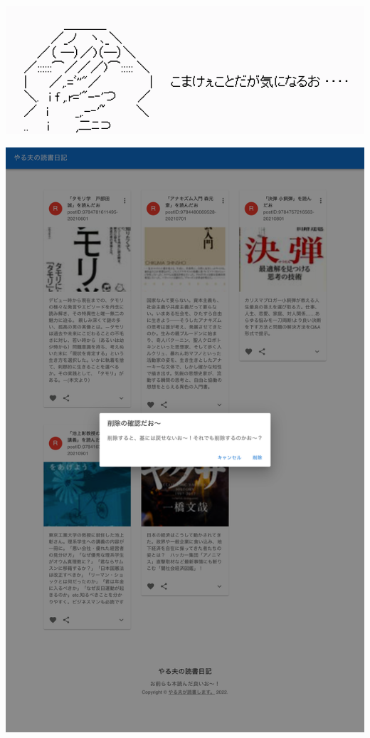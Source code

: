 \begin{reviewimage}[H]%
\includegraphics[width=0.6\maxwidth]{./images/03-todo-with-react/check.png}%
\label{image:03-todo-with-react:check}
\end{reviewimage}

\clearpage

\begin{reviewimage}[H]%
\includegraphics[width=0.7\maxwidth]{./images/03-todo-with-react/mui014-card-deleteDialog-done.png}%
\label{image:03-todo-with-react:mui014-card-deleteDialog-done}
\end{reviewimage}

